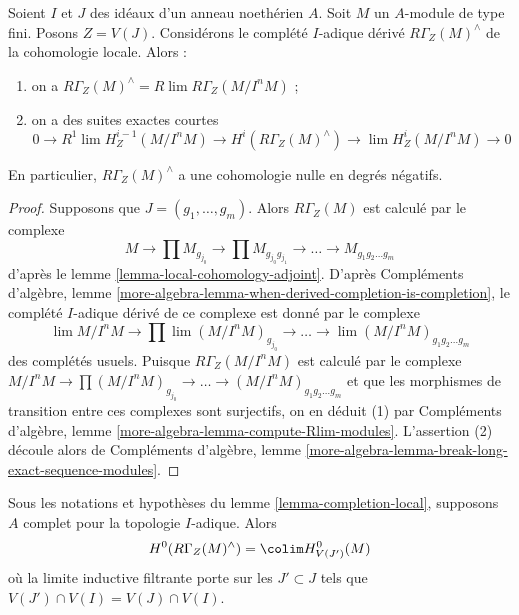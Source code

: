 \begin{lemma}
\label{lemma-completion-local}
Soient $I$ et $J$ des idéaux d'un anneau noethérien $A$.
Soit $M$ un $A$-module de type fini. Posons $Z =V(J)$.
Considérons le complété $I$-adique dérivé $R\Gamma_Z(M)^\wedge$
de la cohomologie locale. Alors :
\begin{enumerate}
\item on a $R\Gamma_Z(M)^\wedge = R\lim R\Gamma_Z(M/I^nM)$ ;
\item on a des suites exactes courtes
$$
0 \to R^1\lim H^{i - 1}_Z(M/I^nM) \to H^i(R\Gamma_Z(M)^\wedge) \to
\lim H^i_Z(M/I^nM) \to 0
$$
\end{enumerate}
En particulier, $R\Gamma_Z(M)^\wedge$ a une cohomologie nulle en degrés négatifs.
\end{lemma}

\begin{proof}
Supposons que $J = (g_1, \ldots, g_m)$.
Alors $R\Gamma_Z(M)$ est calculé par le complexe
$$
M \to \prod M_{g_{j_0}} \to \prod M_{g_{j_0}g_{j_1}} \to
\ldots \to M_{g_1g_2\ldots g_m}
$$
d'après le lemme \ref{lemma-local-cohomology-adjoint}.
D'après Compléments d'algèbre, lemme \ref{more-algebra-lemma-when-derived-completion-is-completion},
le complété $I$-adique dérivé de ce complexe
est donné par le complexe
$$
\lim M/I^nM \to \prod \lim (M/I^nM)_{g_{j_0}} \to
\ldots \to \lim (M/I^nM)_{g_1g_2\ldots g_m}
$$
des complétés usuels. Puisque $R\Gamma_Z(M/I^nM)$ est calculé par le complexe
$ M/I^nM \to \prod (M/I^nM)_{g_{j_0}} \to
\ldots \to (M/I^nM)_{g_1g_2\ldots g_m}$ et que les morphismes de transition entre ces complexes
sont surjectifs, on en déduit (1) par
Compléments d'algèbre, lemme \ref{more-algebra-lemma-compute-Rlim-modules}.
L'assertion (2) découle alors de Compléments d'algèbre, lemme \ref{more-algebra-lemma-break-long-exact-sequence-modules}.
\end{proof}

\begin{lemma}
\label{lemma-completion-local-H0}
Sous les notations et hypothèses du lemme \ref{lemma-completion-local},
supposons $A$ complet pour la topologie $I$-adique. Alors
$$
H^0(R\Gamma_Z(M)^\wedge) = \colim H^0_{V(J')}(M)
$$
où la limite inductive filtrante porte sur les $J' \subset J$ tels que
$V(J') \cap V(I) = V(J) \cap V(I)$.
\end{lemma}

